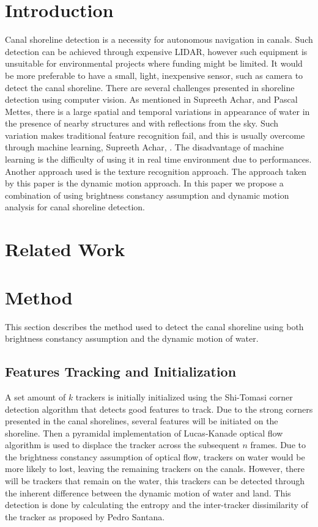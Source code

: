 \documentclass{article}
\begin{document}
\section{Introduction}
Canal shoreline detection is a necessity for autonomous navigation in canals. Such detection can be achieved through expensive LIDAR, however such equipment is unsuitable for environmental projects where funding might be limited. It would be more preferable to have a small, light, inexpensive sensor, such as camera to detect the canal shoreline. There are several challenges presented in shoreline detection using computer vision. As mentioned in Supreeth Achar, and Pascal Mettes, there is a large spatial and temporal variations in appearance of water in the presence of nearby structures and with reflections from the sky. Such variation makes traditional feature recognition fail, and this is usually overcome through machine learning, Supreeth Achar, . The disadvantage of machine learning is the difficulty of using it in real time environment due to performances. Another approach used is the texture recognition approach. The approach taken by this paper is the dynamic motion approach. In this paper we propose a combination of using brightness constancy assumption and dynamic motion analysis for canal shoreline detection.

\section{Related Work}

\section{Method}
This section describes the method used to detect the canal shoreline using both brightness constancy assumption and the dynamic motion of water.
\subsection{Features Tracking and Initialization}
A set amount of $k$ trackers is initially initialized using the Shi-Tomasi corner detection algorithm that detects good features to track. Due to the strong corners presented in the canal shorelines, several features will be initiated on the shoreline. Then a pyramidal implementation of Lucas-Kanade optical flow algorithm is used to displace the tracker across the subsequent $n$ frames. Due to the brightness constancy assumption of optical flow, trackers on water would be more likely to lost, leaving the remaining trackers on the canals. However, there will be trackers that remain on the water, this trackers can be detected through the inherent difference between the dynamic motion of water and land. This detection is done by calculating the entropy and the inter-tracker dissimilarity of the tracker as proposed by Pedro Santana.
\end{document}
